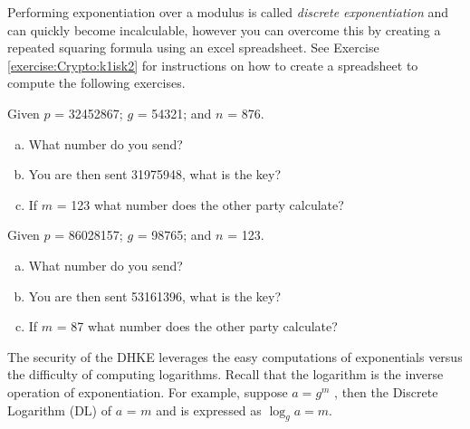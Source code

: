 Performing exponentiation over a modulus is called \emph{discrete exponentiation} and can quickly become incalculable, however you can overcome this by creating a repeated squaring formula using an excel spreadsheet.  See Exercise \ref{exercise:Crypto:k1isk2} for instructions on how to create a spreadsheet to compute the following exercises.
 
\begin{exer}
Given $p$ = 32452867; $g$ = 54321; and $n$ = 876.  
\begin{enumerate}[(a)]
\item What number do you send?  

\item You are then sent 31975948, what is the key? 

\item If $m$ = 123 what number does the other party calculate?
\end{enumerate}
\end{exer}\begin{exer}
Given $p$ = 86028157; $g$ = 98765; and $n$ = 123.  
\begin{enumerate}[(a)]
\item	What number do you send?  

\item You are then sent 53161396, what is the key? 

\item If $m$ = 87 what number does the other party calculate?
\end{enumerate}
\end{exer}
The security of the DHKE leverages the easy computations of exponentials versus the difficulty of computing logarithms. 
Recall that the logarithm is the inverse operation of exponentiation.  For example, suppose $a = g^m$ , then the Discrete Logarithm (DL) of $a$ = $m$ and is expressed as    $\log_g a = m$.   

